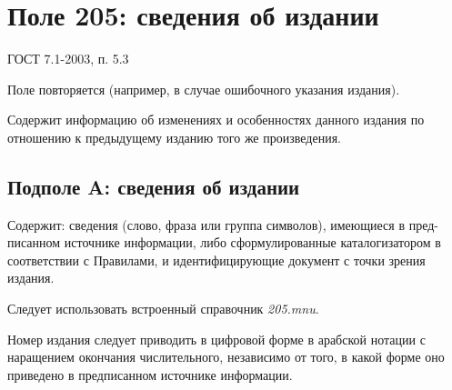 \chapter{Поле 205: сведения об издании}

ГОСТ 7.1-2003, п. 5.3

Поле повторяется (например, в случае ошибочного указания издания).

Содержит информацию об изменениях и особенностях данного издания по отношению к предыдущему изданию того же произведения.

\section*{Подполе A: сведения об издании}

Содержит: сведения (слово, фраза или группа символов), имеющиеся в пред-писанном источнике информации, либо сформулированные каталогизатором в соответствии с Правилами, и идентифицирующие документ с точки зрения издания.

Следует использовать встроенный справочник \textit{205.mnu}.

Номер издания следует приводить в цифровой форме в арабской нотации с наращением окончания числительного, независимо от того, в какой форме оно приведено в предписанном источнике информации.
